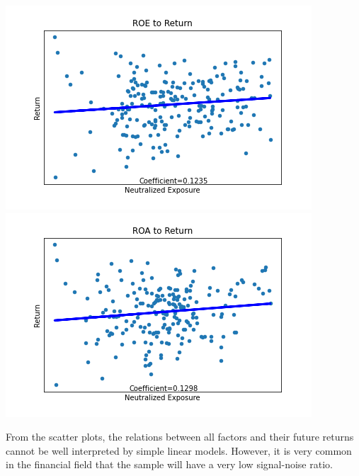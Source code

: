 \documentclass{article}
\begin{document}
\begin{center}
\includegraphics[scale=0.5]{rROE.png}
\includegraphics[scale=0.5]{rROA.png}\\
\end{center}
From the scatter plots, the relations between all factors and their future returns cannot be well interpreted by simple linear models. However, it is very common in the financial field that the sample will have a very low signal-noise ratio.
\end{document}
